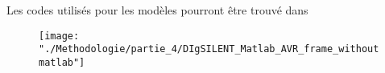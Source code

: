 Les codes utilisés pour les modèles pourront être trouvé dans 

\begin{figure}[H]
	\begin{center}	
		\texttt{[image: "./Methodologie/partie\_4/DIgSILENT\_Matlab\_AVR\_frame\_withoutmatlab"]}
		\caption{}
		\label{fig:DIgSILENT_Matlab_AVR_frame_withoutmatlab}
	\end{center}
\end{figure}




